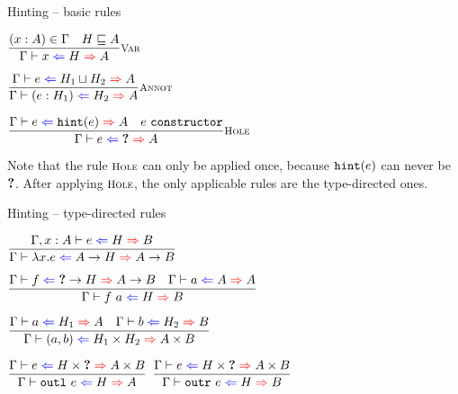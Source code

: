 \documentclass{beamer}
\begin{document}
\begin{frame}{Hinting -- basic rules}

\begin{center}
  $\infrule[Var]{\sidecond{(x : A) \in \Gamma} \quad \sidecond{\hintorder{H}{A}}}{\hinting{x}{H}{A}}$

  \vspace{2em}

  $\infrule[Annot]{\hinting{e}{\combinehints{H_1}{H_2}}{A}}{\hinting{\annot{e}{H_1}}{H_2}{A}}$

  \vspace{2em}

  $\infrule[Hole]{\hinting{e}{\hintfor{e}}{A} \quad \sidecond{e\ \texttt{constructor}}}{\hinting{e}{\Hole}{A}}$
\end{center}

\vspace{2em}

Note that the rule $\textsc{\footnotesize{Hole}}$ can only be applied once, because $\texttt{hint}(e)$ can never be $\textbf{?}$. After applying $\textsc{\footnotesize{Hole}}$, the only applicable rules are the type-directed ones.

\end{frame}

\begin{frame}{Hinting -- type-directed rules}

\begin{center}
  $\infrule{\fullhinting{\extend{\Gamma}{x}{A}}{e}{H}{B}}{\hinting{\fun{x}{e}}{\Fun{A}{H}}{\Fun{A}{B}}}$

  \vspace{1em}

  $\infrule{\hinting{f}{\Fun{\Hole}{H}}{\Fun{A}{B}} \quad \hinting{a}{A}{A}}{\hinting{\app{f}{a}}{H}{B}}$

  \vspace{1em}

  $\infrule{\hinting{a}{H_1}{A} \quad \hinting{b}{H_2}{B}}{\hinting{\pair{a}{b}}{\Prod{H_1}{H_2}}{\Prod{A}{B}}}$

  \vspace{1em}

  $\infrule{\hinting{e}{\Prod{H}{\Hole}}{\Prod{A}{B}}}{\hinting{\outl{e}}{H}{A}}$ \quad
  $\infrule{\hinting{e}{\Prod{H}{\Hole}}{\Prod{A}{B}}}{\hinting{\outr{e}}{H}{B}}$
\end{center}

\end{frame}
\end{document}
